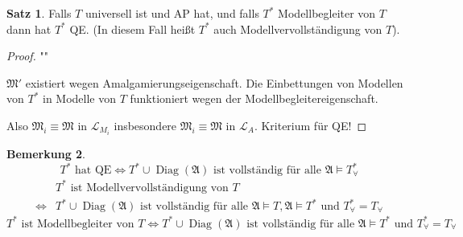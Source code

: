 \documentclass[12pt,parskip=full]{scrartcl}
\theoremstyle{definition}
\newtheorem{theorem}{Satz}[section]
\newtheorem{remark}[theorem]{Bemerkung}
\begin{document}
 	\begin{theorem}
 		Falls $T$ universell ist und AP hat, und falls $T^*$ Modellbegleiter von $T$ dann hat $T^*$ QE. (In diesem Fall heißt $T^*$ auch Modellvervollständigung von $T$).
 	\end{theorem}
 
 	\begin{proof}""
 		\begin{center}
 		\end{center}
 
 	
 		$\mathfrak{M}'$ existiert wegen Amalgamierungseigenschaft. Die Einbettungen von Modellen von $T^*$ in Modelle von $T$ funktioniert wegen der Modellbegleitereigenschaft.
 		
 		Also $\mathfrak{M}_i \equiv \mathfrak{M}$ in $\mathcal{L}_{M_i}$ insbesondere $\mathfrak{M}_i \equiv \mathfrak{M}$ in $\mathcal{L}_A$. Kriterium für QE!
 	\end{proof}
 
 	\begin{remark}
 		\begin{equation*}
	 		T^* \text{ hat QE} \Leftrightarrow T^* \cup \operatorname{Diag}(\mathfrak{A}) \text{ ist vollständig für alle $\mathfrak{A} \models T_\forall^*$}
 		\end{equation*}
 		\begin{align*}
 			&T^* \text{ ist Modellvervollständigung von } T \\ \Leftrightarrow &T^* \cup \operatorname{Diag}(\mathfrak{A}) \text{ ist vollständig für alle $\mathfrak{A} \models T, \mathfrak{A} \models T^*$} \text{ und $T_\forall^* = T_\forall$}
 		\end{align*}
 		\begin{equation*}
	 		T^* \text{ ist Modellbegleiter von $T$} \Leftrightarrow T^* \cup \operatorname{Diag}(\mathfrak{A}) \text{ ist vollständig für alle $\mathfrak{A} \models T^*$} \text{ und $T_\forall^* = T_\forall$}
 		\end{equation*}
 	\end{remark}
 
\end{document}
